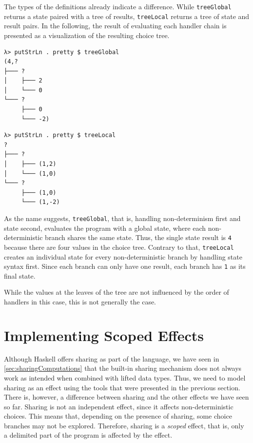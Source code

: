 \documentclass[a4paper, 11pt, fleqn, twoside]{scrreprt}
\newcommand{\hinl}[1]{\texttt{#1}}
\begin{document}
The types of the definitions already indicate a difference.
While \hinl{treeGlobal} returns a state paired with a tree of results, \hinl{treeLocal} returns a tree of state and result pairs.
In the following, the result of evaluating each handler chain is presented as a visualization of the resulting choice tree.

\vspace{0.32cm}

\begin{minipage}{.465 \linewidth}
\begin{verbatim}
λ> putStrLn . pretty $ treeGlobal
(4,?
├─── ?
│    ├─── 2
│    └─── 0
└─── ?
     ├─── 0
     └─── -2)
\end{verbatim}
\end{minipage}
\hfill
\vline
\hfill
\begin{minipage}{.475 \linewidth}
\begin{verbatim}
λ> putStrLn . pretty $ treeLocal
?
├─── ?
│    ├─── (1,2)
│    └─── (1,0)
└─── ?
     ├─── (1,0)
     └─── (1,-2)
\end{verbatim}
\end{minipage}

\vspace{0.32cm}

As the name suggests, \hinl{treeGlobal}, that is, handling non-determinism first and state second, evaluates the program with a global state, where each non-deterministic branch shares the same state.
Thus, the single state result is \hinl{4} because there are four values in the choice tree.
Contrary to that, \hinl{treeLocal} creates an individual state for every non-deterministic branch by handling state syntax first.
Since each branch can only have one result, each branch has \hinl{1} as its final state.

While the values at the leaves of the tree are not influenced by the order of handlers in this case, this is not generally the case.

\section{Implementing Scoped Effects}
\label{sec:sharing}

Although Haskell offers sharing as part of the language, we have seen in \autoref{sec:sharingComputations} that the built-in sharing mechanism does not always work as intended when combined with lifted data types.
Thus, we need to model sharing as an effect using the tools that were presented in the previous section.
There is, however, a difference between sharing and the other effects we have seen so far.
Sharing is not an independent effect, since it affects non-deterministic choices.
This means that, depending on the presence of sharing, some choice branches may not be explored.
Therefore, sharing is a \textit{scoped} effect, that is, only a delimited part of the program is affected by the effect.
\end{document}
